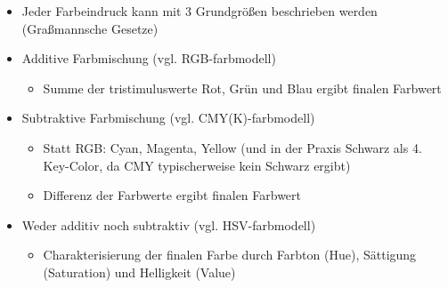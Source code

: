 \documentclass[10pt,a4paper]{article}
\begin{document}
	\begin{itemize}
		\item Jeder Farbeindruck kann mit 3 Grundgrößen beschrieben werden (Graßmannsche Gesetze)
		\item Additive Farbmischung (vgl. RGB-\Gls{farbmodell})
		\begin{itemize}
			\item Summe der \Gls{tristimuluswerte} Rot, Grün und Blau ergibt finalen Farbwert
		\end{itemize}
		\item Subtraktive Farbmischung (vgl. CMY(K)-\Gls{farbmodell})
		\begin{itemize}
			\item Statt RGB: Cyan, Magenta, Yellow (und in der Praxis Schwarz als 4. Key-Color, da CMY typischerweise kein Schwarz ergibt)
			\item Differenz der Farbwerte ergibt finalen Farbwert
		\end{itemize}
		\item Weder additiv noch subtraktiv (vgl. HSV-\Gls{farbmodell})
		\begin{itemize}
			\item Charakterisierung der finalen Farbe durch Farbton (Hue), Sättigung (Saturation) und Helligkeit (Value)
		\end{itemize}
	\end{itemize}
\end{document}
